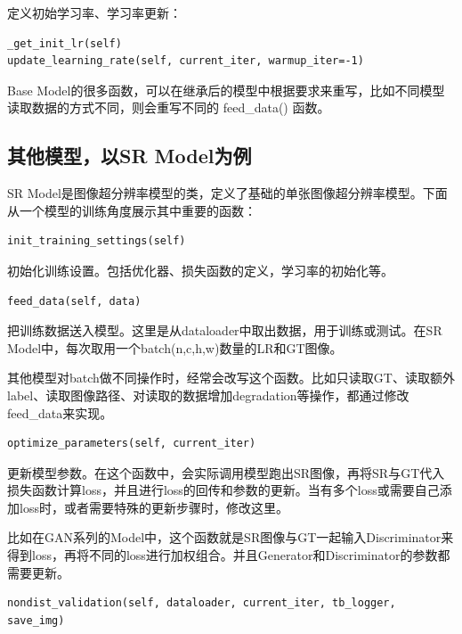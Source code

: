 \documentclass[../main.tex]{subfiles}
\begin{document}
定义初始学习率、学习率更新：
\begin{verbatim}
_get_init_lr(self)
update_learning_rate(self, current_iter, warmup_iter=-1)
\end{verbatim}

\begin{hl} %
Base Model的很多函数，可以在继承后的模型中根据要求来重写，比如不同模型读取数据的方式不同，则会重写不同的 feed\_data() 函数。
\end{hl}

\subsection{其他模型，以SR Model为例}\label{Model:SR Model}

SR Model是图像超分辨率模型的类，定义了基础的单张图像超分辨率模型。下面从一个模型的训练角度展示其中重要的函数：

\begin{verbatim}
init_training_settings(self)
\end{verbatim}

初始化训练设置。包括优化器、损失函数的定义，学习率的初始化等。

\begin{verbatim}
feed_data(self, data)
\end{verbatim}

把训练数据送入模型。这里是从dataloader中取出数据，用于训练或测试。在SR Model中，每次取用一个batch(n,c,h,w)数量的LR和GT图像。

其他模型对batch做不同操作时，经常会改写这个函数。比如只读取GT、读取额外label、读取图像路径、对读取的数据增加degradation等操作，都通过修改feed\_data来实现。


\begin{verbatim}
optimize_parameters(self, current_iter)
\end{verbatim}

更新模型参数。在这个函数中，会实际调用模型跑出SR图像，再将SR与GT代入损失函数计算loss，并且进行loss的回传和参数的更新。当有多个loss或需要自己添加loss时，或者需要特殊的更新步骤时，修改这里。

比如在GAN系列的Model中，这个函数就是SR图像与GT一起输入Discriminator来得到loss，再将不同的loss进行加权组合。并且Generator和Discriminator的参数都需要更新。

\begin{verbatim}
nondist_validation(self, dataloader, current_iter, tb_logger, save_img)
\end{verbatim}
\end{document}
